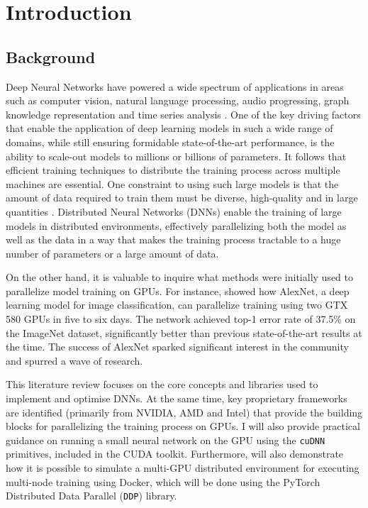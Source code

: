 \section{Introduction}
\label{sec:intro}

\subsection{Background}
Deep Neural Networks have powered a wide spectrum of applications in areas such as computer vision,
natural language processing, audio progressing, graph knowledge representation and time series
analysis \cite{noauthor_papers_nodate}. One of the key driving factors that enable the application
of deep learning models in such a wide range of domains, while still ensuring formidable
state-of-the-art performance, is the ability to scale-out models to millions or billions of
parameters. It follows that efficient training techniques to distribute the training process across
multiple machines are essential. One constraint to using such large models is that the amount of
data required to train them must be diverse, high-quality and in large quantities
\cite{ben-nun_demystifying_2020, dehghani_distributed_2023, langer_distributed_2020}. Distributed
Neural Networks (DNNs) enable the training of large models in distributed environments, effectively
parallelizing both the model as well as the data in a way that makes the training process tractable
to a huge number of parameters or a large amount of data.

On the other hand, it is valuable to inquire what methods were initially used to parallelize model
training on GPUs. For instance, \cite{krizhevsky_imagenet_2012} showed how AlexNet, a deep learning
model for image classification, can parallelize training using two GTX 580 GPUs in five to six
days. The network achieved top-1 error rate of 37.5\% on the ImageNet dataset, significantly better
than previous state-of-the-art results at the time. The success of AlexNet sparked significant
interest in the community and spurred a wave of research.

This literature review focuses on the core concepts and libraries used to implement and optimise
DNNs. At the same time, key proprietary frameworks are identified (primarily from NVIDIA, AMD and
Intel) that provide the building blocks for parallelizing the training process on GPUs. I will also
provide practical guidance on running a small neural network on the GPU using the \texttt{cuDNN}
primitives, included in the CUDA toolkit. Furthermore, will also demonstrate how it is possible to
simulate a multi-GPU distributed environment for executing multi-node training using Docker, which
will be done using the PyTorch Distributed Data Parallel (\texttt{DDP}) library.



